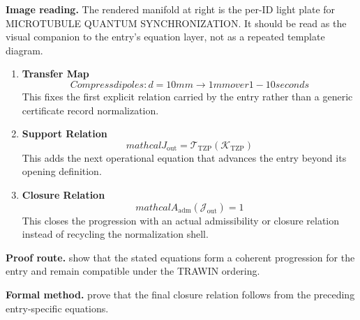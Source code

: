 \begin{samepage}
\noindent\begin{minipage}[t]{0.45\linewidth}
\vspace{0pt}
\raggedright
\scriptsize\textbf{Image reading.} The rendered manifold at right is the per-ID light plate for MICROTUBULE QUANTUM SYNCHRONIZATION. It should be read as the visual companion to the entry's equation layer, not as a repeated template diagram.\par
\end{minipage}\hfill
\begin{minipage}[t]{0.53\linewidth}
\vspace*{-0.10in}
\raggedright
{}
\end{minipage}
\end{samepage}

\clearpage


\begin{enumerate}[leftmargin=1.6em,itemsep=9pt,topsep=6pt]
\item \textbf{Transfer Map}
\[
Compress dipoles: d = 10 mm \to 1 mm over 1-10 seconds
\]
This fixes the first explicit relation carried by the entry rather than a generic certificate record normalization.

\item \textbf{Support Relation}
\[
mathcal{J}_{\mathrm{out}} = \mathcal{T}_{\mathrm{TZP}}\!\left(\mathcal{K}_{\mathrm{TZP}}\right)
\]
This adds the next operational equation that advances the entry beyond its opening definition.

\item \textbf{Closure Relation}
\[
mathcal{A}_{\mathrm{adm}}\!\left(\mathcal{J}_{\mathrm{out}}\right)=1
\]
This closes the progression with an actual admissibility or closure relation instead of recycling the normalization shell.
\end{enumerate}

\textbf{Proof route.} show that the stated equations form a coherent progression for the entry and remain compatible under the TRAWIN ordering.

\textbf{Formal method.} prove that the final closure relation follows from the preceding entry-specific equations.

\medskip
{}

